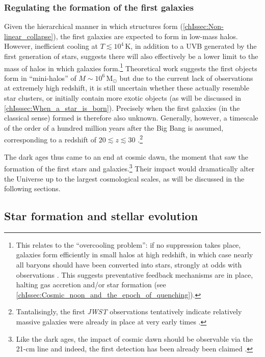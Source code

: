 \subsubsection{Regulating the formation of the first galaxies}
\label{chIsssec:Regulating_the_formation_of_the_first_galaxies}

Given the hierarchical manner in which structures form (\cref{chIssec:Non-linear_collapse}), the first galaxies are expected to form in low-mass halos. However, inefficient cooling at $T \lesssim 10^4 \, \mathrm{K}$, in addition to a UVB generated by the first generation of stars, suggests there will also effectively be a lower limit to the mass of halos in which galaxies form.\footnote{This relates to the ``overcooling problem'': if no suppression takes place, galaxies form efficiently in small halos at high redshift, in which case nearly all baryons should have been converted into stars, strongly at odds with observations \citep{1978MNRAS.183..341W}. This suggests preventative feedback mechanisms are in place, halting gas accretion and/or star formation (see \cref{chIssec:Cosmic_noon_and_the_epoch_of_quenching}).} Theoretical work suggests the first objects form in ``mini-halos'' of $M \sim 10^6 \, \mathrm{M_\odot}$ \citep{2013RPPh...76k2901B} but due to the current lack of observations at extremely high redshift, it is still uncertain whether these actually resemble star clusters, or initially contain more exotic objects (as will be discussed in \cref{chIsssec:When_a_star_is_born}). Precisely when the first galaxies (in the classical sense) formed is therefore also unknown. Generally, however, a timescale of the order of a hundred million years after the Big Bang is assumed, corresponding to a redshift of $20 \lesssim z \lesssim 30$ \citep[e.g.][]{2016ARA&A..54..761S}.\footnote{Tantalisingly, the first \textit{JWST} observations tentatively indicate relatively massive galaxies were already in place at very early times \citep{2022arXiv220712446L}.}

The dark ages thus came to an end at cosmic dawn, the moment that saw the formation of the first stars and galaxies.\footnote{Like the dark ages, the impact of cosmic dawn should be observable via the 21-cm line and indeed, the first detection has been already been claimed \citep{2018Natur.555...67B}.} Their impact would dramatically alter the Universe up to the largest cosmological scales, as will be discussed in the following sections.

\subsection{Star formation and stellar evolution}
\label{chIssec:Star_formation_and_stellar_evolution}

